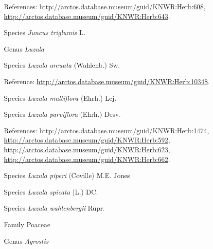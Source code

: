 \documentclass[9pt, article]{memoir}
\begin{document}
\begin{multicols}{2}
\vspace{6pt}References: 
\url{http://arctos.database.museum/guid/KNWR:Herb:608}, 
\url{http://arctos.database.museum/guid/KNWR:Herb:643}.

\vspace{6pt}\noindent\hspace{36pt}Species \textit{Juncus triglumis} L.


\vspace{6pt}\noindent\hspace{30pt}Genus \textit{Luzula}


\vspace{6pt}\noindent\hspace{36pt}Species \textit{Luzula arcuata} (Wahlenb.) Sw.


\vspace{6pt}Reference: 
\url{http://arctos.database.museum/guid/KNWR:Herb:10348}.

\vspace{6pt}\noindent\hspace{36pt}Species \textit{Luzula multiflora} (Ehrh.) Lej.


\vspace{6pt}\noindent\hspace{36pt}Species \textit{Luzula parviflora} (Ehrh.) Desv.


\vspace{6pt}References: 
\url{http://arctos.database.museum/guid/KNWR:Herb:1474}, 
\url{http://arctos.database.museum/guid/KNWR:Herb:592}, 
\url{http://arctos.database.museum/guid/KNWR:Herb:623}, 
\url{http://arctos.database.museum/guid/KNWR:Herb:662}.

\vspace{6pt}\noindent\hspace{36pt}Species \textit{Luzula piperi} (Coville) M.E. Jones


\vspace{6pt}\noindent\hspace{36pt}Species \textit{Luzula spicata} (L.) DC.


\vspace{6pt}\noindent\hspace{36pt}Species \textit{Luzula wahlenbergii} Rupr.


\vspace{6pt}\noindent\hspace{24pt}Family Poaceae


\vspace{6pt}\noindent\hspace{30pt}Genus \textit{Agrostis}



\end{multicols}
\end{document}
